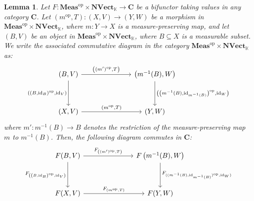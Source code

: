 \documentclass{amsart}
\theoremstyle{definition}
\theoremstyle{plain}
\newtheorem{lemma}[definition]{Lemma}
\newcommand{\id}{\operatorname{id}}
\newcommand{\opMeas}{\mathbf{Meas}^\mathrm{op}}
\newcommand{\NVect}{\mathbf{NVect}_{\mathbb{K}}}
\begin{document}
        \begin{lemma}
        \label{lemma:Beck-Chevalley conditions in the normed case}
            Let $F \colon \opMeas \times \NVect \rightarrow \mathbf{C}$ be a bifunctor taking values in any category $\mathbf{C}$. 
            Let $(m^\mathrm{op},T) \colon (X,V) \rightarrow (Y,W)$ be a morphism in $\opMeas \times \NVect$, where $m \colon Y \rightarrow X$ is a measure-preserving map, and let $(B,V)$ be an object in $\opMeas \times \NVect$, where $B \subseteq X$ is a measurable subset. 
            We write the associated commutative diagram in the category $\opMeas \times \NVect$ as:
            \begin{equation}  
            \label{eq:Beck-Chevally diagram in the normed case}
                \begin{tikzcd}
                    (B,V) \ar[dd, "{\left( \left( B,\id_B \right)^{\mathrm{op}},\id _V \right)}"'] \ar[rrr, "{\left( (m')^{\mathrm{op}},T \right)}"] & & & \left( m^{-1}(B),W \right) \ar[dd, "{\left( \left( m^{-1}(B),\id_{m^{-1}(B)} \right)^{\mathrm{op}},\id_W \right)}"]  \\
                        & & & \\
                    (X,V) \ar[rrr, "{\left( m^\mathrm{op},T \right)}"] & & & (Y,W)
                \end{tikzcd}
            \end{equation}
            where $m' \colon m^{-1}(B) \rightarrow B$ denotes the restriction of the measure-preserving map $m$ to $m^{-1}(B)$. 
            Then, the following diagram commutes in $\mathbf{C}$: 
            \begin{equation*}
                \begin{tikzcd}
                    F(B,V) \ar[dd, "F_{\left( \left( B,\id_B \right)^{\mathrm{op}},\id _V \right)}"'] \ar[rrr, "F_{\left( (m')^{\mathrm{op}},T \right)}"] & & & F\left( m^{-1}(B),W \right) \ar[dd, "F_{( ( m^{-1}(B),\id_{m^{-1}(B)} )^{\mathrm{op}},\id_W )}"]  \\
                        & & & \\
                    F(X,V) \ar[rrr, "F_{\left( m^\mathrm{op},T \right)}"] & & & F(Y,W)
                \end{tikzcd}
            \end{equation*}
        \end{lemma}
\end{document}
